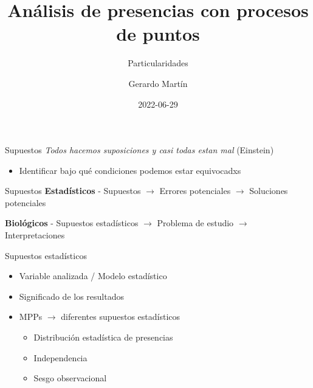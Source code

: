 \documentclass[
  11pt,
  ignorenonframetext,
]{beamer}
\title{Análisis de presencias con procesos de puntos}
\subtitle{Particularidades}
\author{Gerardo Martín}
\date{2022-06-29}
\providecommand{\tightlist}{%
  \setlength{\itemsep}{0pt}\setlength{\parskip}{0pt}}
\begin{document}
\frame{\titlepage}

\begin{frame}{Supuestos}
\protect\hypertarget{supuestos}{}
\emph{Todos hacemos suposiciones y casi todas estan mal} (Einstein)

\begin{itemize}
\tightlist
\item
  Identificar bajo qué condiciones podemos estar equivocadxs
\end{itemize}
\end{frame}

\begin{frame}{Supuestos}
\protect\hypertarget{supuestos-1}{}
\textbf{Estadísticos} - Supuestos \(\rightarrow\) Errores potenciales
\(\rightarrow\) Soluciones potenciales

\textbf{Biológicos} - Supuestos estadísticos \(\rightarrow\) Problema de
estudio \(\rightarrow\) Interpretaciones
\end{frame}

\begin{frame}{Supuestos estadísticos}
\protect\hypertarget{supuestos-estaduxedsticos}{}
\begin{itemize}
\item
  Variable analizada / Modelo estadístico
\item
  Significado de los resultados
\item
  MPPs \(\rightarrow\) diferentes supuestos estadísticos

  \begin{itemize}
  \tightlist
  \item
    Distribución estadística de presencias
  \item
    Independencia
  \item
    Sesgo observacional
  \end{itemize}
\end{itemize}
\end{frame}
\end{document}
